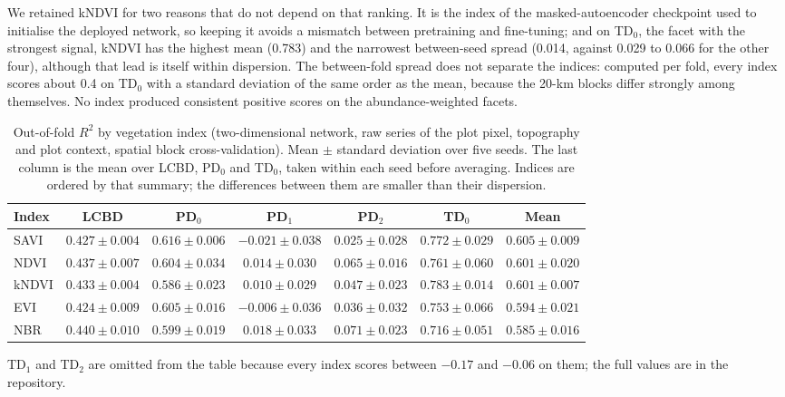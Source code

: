 \documentclass[preprint,12pt]{elsarticle}
\begin{document}
We retained kNDVI for two reasons that do not depend on that ranking. It is the index of
the masked-autoencoder checkpoint used to initialise the deployed network, so keeping it
avoids a mismatch between pretraining and fine-tuning; and on TD$_0$, the facet with the
strongest signal, kNDVI has the highest mean (0.783) and the narrowest between-seed spread
(0.014, against 0.029 to 0.066 for the other four), although that lead is itself within
dispersion. The between-fold spread does not separate the indices: computed per fold, every
index scores about 0.4 on TD$_0$ with a standard deviation of the same order as the mean,
because the 20-km blocks differ strongly among themselves.
No index produced consistent positive scores on the abundance-weighted facets.

\begin{table}[t]
\centering
\footnotesize
\caption{Out-of-fold $R^2$ by vegetation index (two-dimensional network, raw series of the
plot pixel, topography and plot context, spatial block cross-validation). Mean $\pm$
standard deviation over five seeds. The last column is the mean over LCBD, PD$_0$ and
TD$_0$, taken within each seed before averaging. Indices are ordered by that summary; the
differences between them are smaller than their dispersion.}
\label{tab:s_index}
\begin{tabular}{lcccccc}
\toprule
Index & LCBD & PD$_0$ & PD$_1$ & PD$_2$ & TD$_0$ & Mean \\
\midrule
SAVI  & $0.427\pm0.004$ & $0.616\pm0.006$ & $-0.021\pm0.038$ & $0.025\pm0.028$ & $0.772\pm0.029$ & $0.605\pm0.009$ \\
NDVI  & $0.437\pm0.007$ & $0.604\pm0.034$ & $0.014\pm0.030$ & $0.065\pm0.016$ & $0.761\pm0.060$ & $0.601\pm0.020$ \\
kNDVI & $0.433\pm0.004$ & $0.586\pm0.023$ & $0.010\pm0.029$ & $0.047\pm0.023$ & $\mathbf{0.783\pm0.014}$ & $0.601\pm0.007$ \\
EVI   & $0.424\pm0.009$ & $0.605\pm0.016$ & $-0.006\pm0.036$ & $0.036\pm0.032$ & $0.753\pm0.066$ & $0.594\pm0.021$ \\
NBR   & $0.440\pm0.010$ & $0.599\pm0.019$ & $0.018\pm0.033$ & $0.071\pm0.023$ & $0.716\pm0.051$ & $0.585\pm0.016$ \\
\bottomrule
\end{tabular}

\vspace{2pt}
\footnotesize TD$_1$ and TD$_2$ are omitted from the table because every index scores
between $-0.17$ and $-0.06$ on them; the full values are in the repository.
\end{table}



\end{document}

